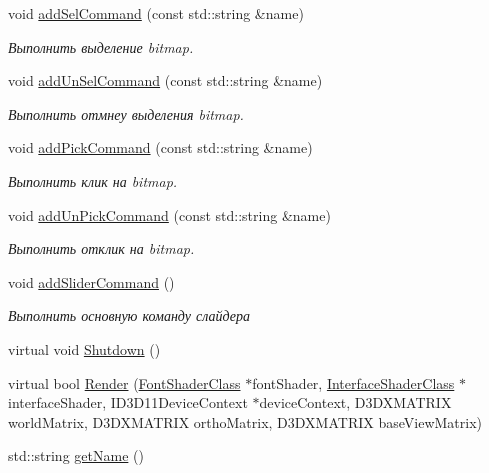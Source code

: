 \begin{DoxyCompactItemize}
void \hyperlink{class_slider_element_class_a37d2eff7e6d2a0f2c0cd628dafb096e5}{add\+Sel\+Command} (const std\+::string \&name)
\begin{DoxyCompactList}\small\item\em Выполнить выделение bitmap. \end{DoxyCompactList}\item 
void \hyperlink{class_slider_element_class_aab0bdceef3fb3407c0d56d0011806a21}{add\+Un\+Sel\+Command} (const std\+::string \&name)
\begin{DoxyCompactList}\small\item\em Выполнить отмнеу выделения bitmap. \end{DoxyCompactList}\item 
void \hyperlink{class_slider_element_class_a2466f36f541259a81c690b366ca66bd4}{add\+Pick\+Command} (const std\+::string \&name)
\begin{DoxyCompactList}\small\item\em Выполнить клик на bitmap. \end{DoxyCompactList}\item 
void \hyperlink{class_slider_element_class_a2844280cd2d938b7f96e5e9640de4d09}{add\+Un\+Pick\+Command} (const std\+::string \&name)
\begin{DoxyCompactList}\small\item\em Выполнить отклик на bitmap. \end{DoxyCompactList}\item 
void \hyperlink{class_slider_element_class_aa47097c84ebf1a0f32ba42cc853d9819}{add\+Slider\+Command} ()
\begin{DoxyCompactList}\small\item\em Выполнить основную команду слайдера \end{DoxyCompactList}\item 
virtual void \hyperlink{class_interface_element_class_aa710f6d66c3aa4c2d0a23fdd2b75a1f0}{Shutdown} ()
\item 
virtual bool \hyperlink{class_interface_element_class_a18b876383a39bb3fb1a6325f6518befc}{Render} (\hyperlink{class_font_shader_class}{Font\+Shader\+Class} $\ast$font\+Shader, \hyperlink{class_interface_shader_class}{Interface\+Shader\+Class} $\ast$interface\+Shader, I\+D3\+D11\+Device\+Context $\ast$device\+Context, D3\+D\+X\+M\+A\+T\+R\+IX world\+Matrix, D3\+D\+X\+M\+A\+T\+R\+IX ortho\+Matrix, D3\+D\+X\+M\+A\+T\+R\+IX base\+View\+Matrix)
\item 
std\+::string \hyperlink{class_interface_element_class_a7815b1d9629ff4dc8a83c170dbb171fc}{get\+Name} ()

\end{DoxyCompactItemize}
